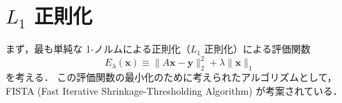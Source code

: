 \section[L1 正則化]{$L_1$ 正則化}

まず，最も単純な 1-ノルムによる正則化（$L_1$ 正則化）による評価関数
\begin{equation}
    E_{\lambda}(\bm{x}) \equiv \|A \bm{x} - \bm{y}\|_2^2 + \lambda \|\bm{x}\|_1
    \label{eq:regularization_sparse_l1_objective}
\end{equation}
を考える．
この評価関数の最小化のために考えられたアルゴリズムとして，
FISTA (Fast Iterative Shrinkage-Thresholding Algorithm) \cite{Beck2009}
が考案されている．


